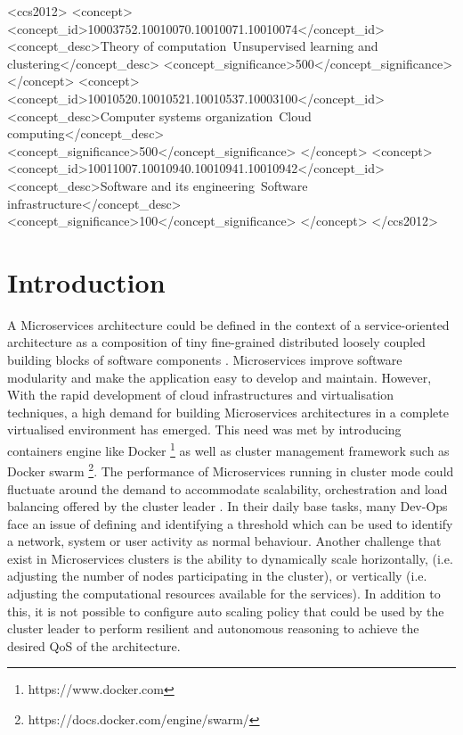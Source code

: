 \documentclass[sigconf]{acmart}
\begin{document}
%
%
  \begin{CCSXML}
<ccs2012>
<concept>
<concept_id>10003752.10010070.10010071.10010074</concept_id>
<concept_desc>Theory of computation~Unsupervised learning and clustering</concept_desc>
<concept_significance>500</concept_significance>
</concept>
<concept>
<concept_id>10010520.10010521.10010537.10003100</concept_id>
<concept_desc>Computer systems organization~Cloud computing</concept_desc>
<concept_significance>500</concept_significance>
</concept>
<concept>
<concept_id>10011007.10010940.10010941.10010942</concept_id>
<concept_desc>Software and its engineering~Software infrastructure</concept_desc>
<concept_significance>100</concept_significance>
</concept>
</ccs2012>
\end{CCSXML}



\maketitle

%

 
 \section{Introduction}
A Microservices architecture could be defined in the context of a service-oriented architecture as a composition of tiny fine-grained distributed loosely coupled building blocks of software components \cite{stubbs2015distributed}. Microservices improve software modularity and make the application easy to develop and maintain. However, With the rapid development of cloud infrastructures and virtualisation techniques, a high demand for building Microservices architectures in a complete virtualised environment has emerged. This need was met by introducing containers engine like Docker \footnote{https://www.docker.com} as well as cluster management framework such as Docker swarm \footnote{https://docs.docker.com/engine/swarm/}.  
The performance of Microservices running in cluster mode could fluctuate around the demand to accommodate scalability, orchestration and load balancing offered by the cluster leader \cite{stubbs2015distributed}. In their daily base tasks,  many Dev-Ops face an issue of defining and identifying a threshold which can be used to identify a network, system or user activity as normal behaviour. Another challenge that exist in Microservices clusters is the ability to dynamically scale horizontally, (i.e. adjusting the number of nodes participating in the cluster), or vertically (i.e. adjusting the computational resources available for the services). In addition to this, it is not possible to configure auto scaling policy that could be used by the cluster leader to perform resilient and autonomous reasoning to achieve the desired QoS of the architecture. 
\end{document}
